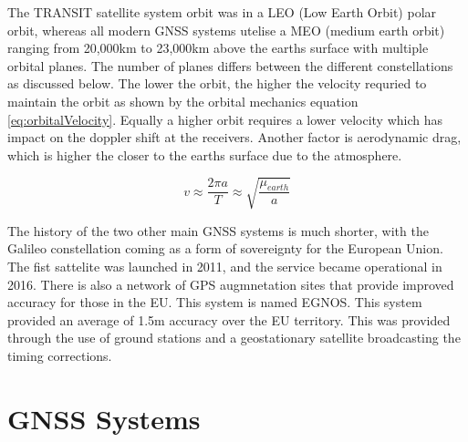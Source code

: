 The TRANSIT satellite system orbit was in a LEO (Low Earth Orbit) polar orbit, whereas all modern GNSS systems utelise a MEO (medium earth orbit) ranging from 20,000km to
23,000km above the earths surface with multiple orbital planes. The number of planes differs between the different constellations as discussed below. The lower the orbit,
the higher the velocity requried to maintain the orbit as shown by the orbital mechanics equation \ref{eq:orbitalVelocity}. Equally a higher orbit requires a lower
velocity which has impact on the doppler shift at the receivers. Another factor is aerodynamic drag, which is higher the closer to the earths surface due to the
atmosphere.

\begin{equation} \label{eq:orbitalVelocity}
    v \approx \frac{2\pi a}{T} \approx \sqrt{\frac{\mu_{earth}}{a}}
\end{equation} 

The history of the two other main GNSS systems is much shorter, with the Galileo constellation coming as a form of sovereignty for the European Union. The fist sattelite
was launched in 2011, and the service became operational in 2016. There is also a network of GPS augmnetation sites that provide improved accuracy for those in the EU.
This system is named EGNOS. This system provided an average of 1.5m accuracy over the EU territory. This was provided through the use of ground stations and a
geostationary satellite broadcasting the timing corrections. 


\section{GNSS Systems} \label{sec:GNSS}
